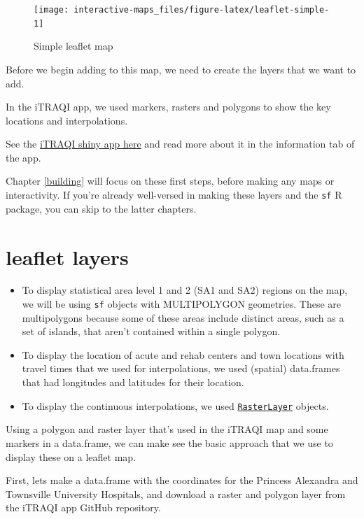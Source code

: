 \documentclass[
]{book}
\begin{document}
\begin{figure}
\texttt{[image: interactive-maps\_files/figure-latex/leaflet-simple-1]} \caption{Simple leaflet map}\label{fig:leaflet-simple}
\end{figure}

Before we begin adding to this map, we need to create the layers that we want to add.

In the iTRAQI app, we used markers, rasters and polygons to show the key locations and interpolations.

See the \href{https://access.healthequity.link/}{iTRAQI shiny app here} and read more about it in the information tab of the app.

Chapter \ref{building} will focus on these first steps, before making any maps or interactivity. If you're already well-versed in making these layers and the \texttt{sf} R package, you can skip to the latter chapters.

\hypertarget{leaflet-layers}{%
\section{leaflet layers}\label{leaflet-layers}}

\begin{itemize}
\item
  To display statistical area level 1 and 2 (SA1 and SA2) regions on the map, we will be using \texttt{sf} objects with MULTIPOLYGON geometries. These are multipolygons because some of these areas include distinct areas, such as a set of islands, that aren't contained within a single polygon.
\item
  To display the location of acute and rehab centers and town locations with travel times that we used for interpolations, we used (spatial) data.frames that had longitudes and latitudes for their location.
\item
  To display the continuous interpolations, we used \href{https://rdrr.io/cran/raster/man/raster.html}{\texttt{RasterLayer}} objects.
\end{itemize}

Using a polygon and raster layer that's used in the iTRAQI map and some markers in a data.frame, we can make see the basic approach that we use to display these on a leaflet map.

First, lets make a data.frame with the coordinates for the Princess Alexandra and Townsville University Hospitals, and download a raster and polygon layer from the iTRAQI app GitHub repository.
\end{document}
